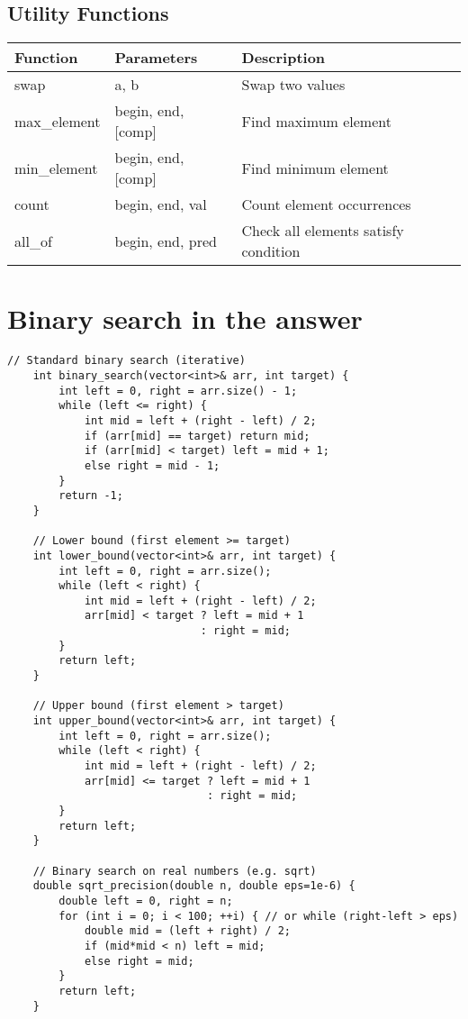 \documentclass[10pt]{article}
\begin{document}
\begin{multicols*}{2}
\subsection*{Utility Functions}
\begin{tabularx}{\linewidth}{|l|l|X|}
    \hline
    \textbf{Function} & \textbf{Parameters} & \textbf{Description} \\
    \hline
    swap & a, b & Swap two values \\
    \hline
    max\_element & begin, end, [comp] & Find maximum element \\
    \hline
    min\_element & begin, end, [comp] & Find minimum element \\
    \hline
    count & begin, end, val & Count element occurrences \\
    \hline
    all\_of & begin, end, pred & Check all elements satisfy condition \\
    \hline
\end{tabularx}
\section{Binary search in the answer}
\begin{lstlisting}[style=compactcpp]
    // Standard binary search (iterative)
    int binary_search(vector<int>& arr, int target) {
        int left = 0, right = arr.size() - 1;
        while (left <= right) {
            int mid = left + (right - left) / 2;
            if (arr[mid] == target) return mid;
            if (arr[mid] < target) left = mid + 1;
            else right = mid - 1;
        }
        return -1;
    }
    
    // Lower bound (first element >= target)
    int lower_bound(vector<int>& arr, int target) {
        int left = 0, right = arr.size();
        while (left < right) {
            int mid = left + (right - left) / 2;
            arr[mid] < target ? left = mid + 1 
                              : right = mid;
        }
        return left;
    }
    
    // Upper bound (first element > target)
    int upper_bound(vector<int>& arr, int target) {
        int left = 0, right = arr.size();
        while (left < right) {
            int mid = left + (right - left) / 2;
            arr[mid] <= target ? left = mid + 1 
                               : right = mid;
        }
        return left;
    }
    
    // Binary search on real numbers (e.g. sqrt)
    double sqrt_precision(double n, double eps=1e-6) {
        double left = 0, right = n;
        for (int i = 0; i < 100; ++i) { // or while (right-left > eps)
            double mid = (left + right) / 2;
            if (mid*mid < n) left = mid;
            else right = mid;
        }
        return left;
    }
    

\end{lstlisting}
\end{multicols*}
\end{document}

